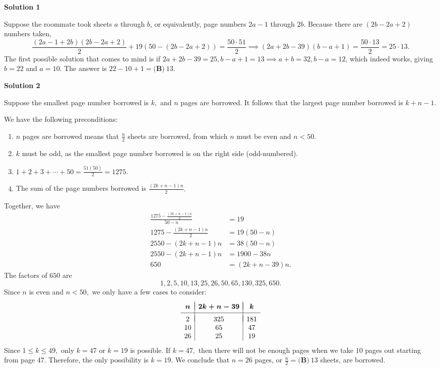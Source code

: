 \begin{enumerate}
\textbf{Solution 1}

Suppose the roommate took sheets $a$ through $b$, or equivalently, page numbers $2a-1$ through $2b$. Because there are $(2b-2a+2)$ numbers taken, 
 \[\frac{(2a-1+2b)(2b-2a+2)}{2}+19(50-(2b-2a+2))=\frac{50\cdot51}{2} \implies (2a+2b-39)(b-a+1)=\frac{50\cdot13}{2}=25\cdot13.\] The first possible solution that comes to mind is if $2a+2b-39=25, b-a+1=13 \implies a+b=32, b-a=12$, which indeed works, giving $b=22$ and $a=10$. The answer is $22-10+1=\boxed{\textbf{(B)} ~13}$.

 



\textbf{Solution 2}

Suppose the smallest page number borrowed is $k,$ and $n$ pages are borrowed. It follows that the largest page number borrowed is $k+n-1.$

 We have the following preconditions:

 
            \begin{enumerate} 
        \item $n$ pages are borrowed means that $\frac{n}{2}$ sheets are borrowed, from which $n$ must be even and $n<50.$

        \item $k$ must be odd, as the smallest page number borrowed is on the right side (odd-numbered).

        \item $1+2+3+\cdots+50=\frac{51(50)}{2}=1275.$

        \item The sum of the page numbers borrowed is $\frac{(2k+n-1)n}{2}.$

            \end{enumerate}
            Together, we have 
 \begin{align*} \frac{1275-\frac{(2k+n-1)n}{2}}{50-n}&=19 \\ 1275-\frac{(2k+n-1)n}{2}&=19(50-n) \\ 2550-(2k+n-1)n&=38(50-n) \\ 2550-(2k+n-1)n&=1900-38n \\ 650&=(2k+n-39)n. \end{align*}
The factors of $650$ are 
 \[1,2,5,10,13,25,26,50,65,130,325,650.\] Since $n$ is even and $n<50,$ we only have a few cases to consider:
 \[\begin{array}{c|c|c} & & \\ [-2.25ex]  \boldsymbol{n} & \boldsymbol{2k+n-39} & \boldsymbol{k} \\ [0.5ex] \hline  & & \\ [-2ex]  2 & 325 & 181 \\    10 & 65 & 47 \\  26 & 25 & 19 \end{array}\]Since $1\leq k \leq 49,$ only $k=47$ or $k=19$ is possible. If $k=47,$ then there will not be enough pages when we take $10$ pages out starting from page $47.$ Therefore, the only possibility is $k=19.$ We conclude that $n=26$ pages, or $\frac n2=\boxed{\textbf{(B)} ~13}$ sheets, are borrowed.


\end{enumerate}
